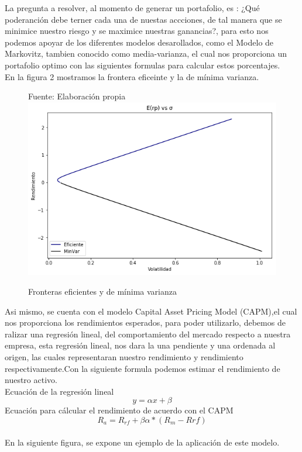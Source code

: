 \documentclass[12pt,a4paper]{article}
\begin{document}
    \hfill\break
    La pregunta a resolver, al momento de generar un portafolio, es : ¿Qué poderanción debe terner cada una de nuestas accciones, de tal manera que se minimice nuestro riesgo y se maximice nuestras ganancias?, para esto nos podemos apoyar de los diferentes modelos desarollados, como el Modelo de Markovitz, tambien conocido como media-varianza, el cual nos proporciona un portafolio optimo con las siguientes formulas para calcular estos porcentajes.\\
    En la figura 2 mostramos la frontera eficeinte y la de mínima varianza.
    \hfill\break
    \begin{figure}
		\centering
		\caption{Fronteras eficientes y de mínima varianza}{{\footnotesize Fuente: Elaboración propia}}
		\includegraphics[scale=0.6]{markovitz.png}
	\end{figure}
	\hfill\break
	Asi mismo, se cuenta con el modelo Capital Asset Pricing Model (CAPM),el cual nos proporciona los rendimientos esperados, para poder utilizarlo, debemos de ralizar una regresión lineal, del comportamiento del mercado respecto a nuestra empresa, esta regresión lineal, nos dara la una pendiente y una ordenada al origen, las cuales representaran nuestro rendimiento y rendimiento respectivamente.Con la siguiente formula podemos estimar el rendimiento de nuestro activo.\\
	Ecuación de la regresión lineal\\
	$$y=\alpha x+\beta$$
	Ecuación para cálcular el rendimiento de acuerdo con el CAPM\\
	$$R_{a} = R_{rf} + \beta \alpha* (R_{m} - R{rf})$$\\
	En la siguiente figura, se expone un ejemplo de la aplicación de este modelo.\\
\end{document}
